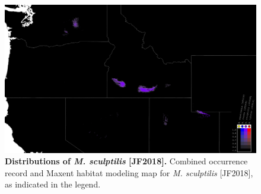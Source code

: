 \documentclass[fleqn,10pt,lineno]{wlpeerj} %
\begin{document}
\begin{figure}[h]
	\centering
	\begin{sideways}
		\includegraphics[height=0.85\textwidth]{figure38.png}
		\end{sideways}
	\caption{\textbf{Distributions of \textit{M. sculptilis} [JF2018].} Combined occurrence record and Maxent habitat modeling map for \textit{M. sculptilis} [JF2018], as indicated in the legend.}
	\label{fig:map_sculptilis}
\end{figure}
\end{document}
